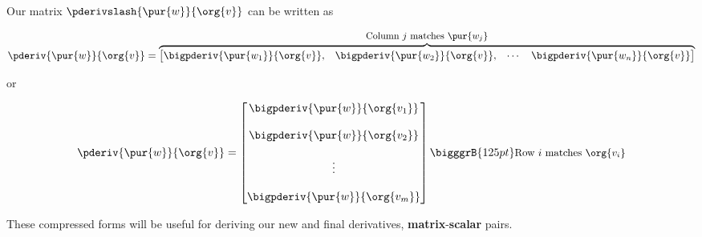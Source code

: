         \begin{notation}
            Our matrix $\pderivslash{ \pur{w} }{ \org{v} }$ can be written as
            
            \begin{equation*}
                \pderiv{ \pur{w} }{ \org{v} } 
                =
                \overbrace{
                    \begin{bmatrix}
                        \bigpderiv{ \pur{w_1} }{ \org{v} }, &
                        \bigpderiv{ \pur{w_2} }{ \org{v} }, &
                        \cdots &
                        \bigpderiv{ \pur{w_n} }{ \org{v} } 
                    \end{bmatrix}
                }^{ \text{\small Column $j$ matches $\pur{w_j}$} }
            \end{equation*}
            
            \phantom{}
            
            \centerline{or \phantom{xxxxxxxxxx}}
            
            \phantom{}
            
            \begin{equation*}
                \pderiv{ \pur{w} }{ \org{v} } 
                =
                \begin{bmatrix}
                    \bigpderiv{ \pur{w} }   { \org{v_1} }\\ 
                    \\
                    \bigpderiv{ \pur{w} }   { \org{v_2} }\\ 
                    \\
                    \vdots \\ 
                    \\
                    \bigpderiv{ \pur{w} }   { \org{v_m} }
                \end{bmatrix}
                \bigggrB{125pt} \text{\small Row $i$ matches $\org{v_i}$} 
            \end{equation*}
        \end{notation}
        
        These compressed forms will be useful for deriving our new and final derivatives, \textbf{matrix}-\textbf{scalar} pairs.
            
